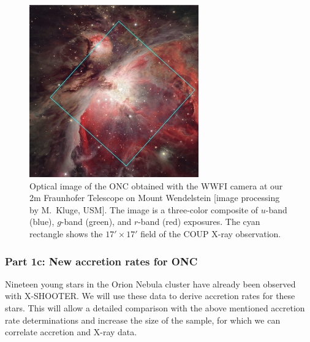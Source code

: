 \documentclass[10pt,fleqn,twoside,a4paper]{article}
\begin{document}
\begin{figure} %
\centering
\includegraphics[width=0.65\textwidth]{onc-wwfi-coup-c.ps}
\caption{Optical image of the ONC obtained with the WWFI camera
at our 2m Fraunhofer Telescope on Mount Wendelstein [image processing by M.~Kluge, USM].
The image is a three-color composite of $u$-band (blue), $g$-band (green), and
$r$-band (red) exposures.
The cyan rectangle shows the $17' \times 17'$
field of the COUP X-ray observation.
\label{onc-wwfi.fig}}
\end{figure} %




\bigskip

\subsubsection*{Part 1c: New accretion rates for ONC}


Nineteen young stars in the Orion Nebula cluster have already been
observed with X-SHOOTER.
We will use these data to derive accretion rates for these stars.
This will allow a detailed comparison with the above mentioned accretion rate
determinations and increase the size of the sample, for which we
can correlate accretion and X-ray data.
\medskip
\end{document}

